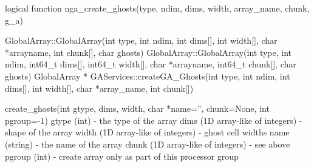 \documentclass[12pt]{article}
\begin{document}
\begin{fapi}
\begin{fcode}
logical function nga_create_ghosts(type, ndim, dims, width, array_name, 
                                   chunk, g_a) 
\end{fcode}
\begin{funcargs}
\end{funcargs}
\end{fapi}

\begin{cxxapi}
\begin{cxxcode}
GlobalArray::GlobalArray(int type, int ndim, int dims[], int width[],
                         char *arrayname, int chunk[], char ghosts)
GlobalArray::GlobalArray(int type, int ndim, int64_t dims[], int64_t width[],
                         char *arrayname, int64_t chunk[], char ghosts)
GlobalArray * GAServices::createGA_Ghosts(int type, int ndim, int dims[],
                                          int width[], char *array_name, 
                                          int chunk[])
\end{cxxcode}
\begin{funcargs}
\end{funcargs}
\end{cxxapi}

\begin{pyapi}
\begin{pycode}
create_ghosts(int gtype, dims, width, char *name='', chunk=None, int pgroup=-1)
   gtype (int)                       - the type of the array
   dims (1D array-like of integers)  - shape of the array
   width (1D array-like of integers) - ghost cell widths
   name (string)                     - the name of the array
   chunk (1D array-like of integers) - see above
   pgroup (int)                      - create array only as part of this 
                                       processor group
\end{pycode}
\end{pyapi}
\end{document}
